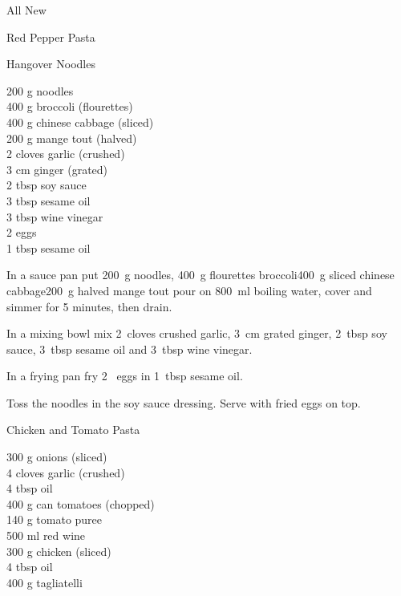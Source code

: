 \begin{menu}{All New}
\begin{recipe}{2}{Red Pepper Pasta}
\begin{instructions}
    \end{instructions}
    \end{recipe}%
  
    \begin{recipe}{1}{Hangover Noodles}%
    
		\begin{ingredients}
		200 g noodles  \\
	400 g broccoli (flourettes) \\
	400 g chinese cabbage (sliced) \\
	200 g mange tout (halved) \\
	2 cloves garlic (crushed) \\
	3 cm ginger (grated) \\
	2 tbsp soy sauce  \\
	3 tbsp sesame oil  \\
	3 tbsp wine vinegar  \\
	2  eggs  \\
	1 tbsp sesame oil  \\
	
		\end{ingredients}
	
    \begin{instructions}
    \item 
        In a sauce pan
        put
        200~g  noodles,
        400~g flourettes broccoli400~g sliced chinese cabbage200~g halved mange tout
        pour on 800~ml  boiling water,
        cover and simmer for 5 minutes, then drain.
      \item 
        In a mixing bowl mix
        2~cloves crushed garlic,
        3~cm grated ginger,
        2~tbsp  soy sauce,
        3~tbsp  sesame oil and
        3~tbsp  wine vinegar.
      \item 
        In a frying pan fry
        2~  eggs
        in
        1~tbsp  sesame oil.
      \item 
        Toss the noodles in the soy sauce dressing.
        Serve with fried eggs on top.
      
    \end{instructions}
    \end{recipe}%
  
    \begin{recipe}{2}{Chicken and Tomato Pasta}%
    
		\begin{ingredients}
		300 g onions (sliced) \\
	4 cloves garlic (crushed) \\
	4 tbsp oil  \\
	400 g can tomatoes (chopped) \\
	140 g tomato puree  \\
	500 ml red wine  \\
	300 g chicken (sliced) \\
	4 tbsp oil  \\
	400 g tagliatelli  \\
	

\end{ingredients}
\end{recipe}
\end{menu}
